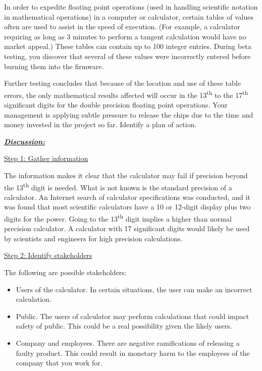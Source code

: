 In order to expedite floating­ point operations (used in handling
scientific notation in mathematical operations) in a computer or
calculator, certain tables of values often are used to assist in the
speed of execution. (For example, a calculator requiring as long as 3
minutes to perform a tangent calculation would have no market appeal.)
These tables can contain up to 100 integer entries. During beta testing,
you discover that several of these values were incorrectly entered
before burning them into the firmware.

Further testing concludes that because of the location and use of these
table errors, the only mathematical results affected will occur in the
13\textsuperscript{th} to the 17\textsuperscript{th} significant digits
for the double­ precision floating point operations. Your management is
applying subtle pressure to release the chips due to the time and money
invested in the project so far. Identify a plan of action.

\emph{\textbf{\ul{Discussion:}}}

\ul{Step 1: Gather information}

The information makes it clear that the calculator may fail if precision
beyond the 13\textsuperscript{th} digit is needed. What is not known is
the standard precision of a calculator. An Internet search of calculator
specifications was conducted, and it was found that most scientific
calculators have a 10 or 12-digit display plus two digits for the power.
Going to the 13\textsuperscript{th} digit implies a higher than normal
precision calculator. A calculator with 17 significant digits would
likely be used by scientists and engineers for high precision
calculations.

\ul{Step 2: Identify stakeholders}

The following are possible stakeholders:

\begin{itemize}
\item
  Users of the calculator. In certain situations, the user can make an
  incorrect calculation.
\item
  Public. The users of calculator may perform calculations that could
  impact safety of public. This could be a real possibility given the
  likely users.
\item
  Company and employees. There are negative ramifications of releasing a
  faulty product. This could result in monetary harm to the employees of
  the company that you work for.
\end{itemize}

